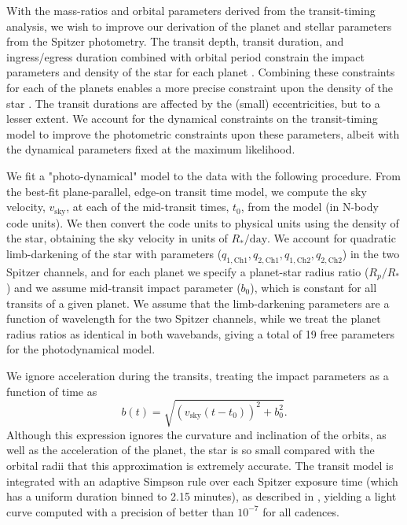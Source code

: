 \documentclass[fleqn,usenatbib]{mnras} %
\begin{document}
With the mass-ratios and orbital parameters derived from the transit-timing
analysis, we wish to improve our derivation of the planet and stellar parameters 
from the Spitzer photometry.   The transit depth, transit duration, and ingress/egress 
duration combined with  orbital period constrain the impact parameters and density 
of the star for each planet \citep{Seager2003}.  Combining these constraints for 
each of the planets  enables a more precise constraint upon the density of the 
star \citep{Kipping2012a}.
The transit durations are affected by the (small) eccentricities, but to a lesser extent.  We account 
for the dynamical constraints on the transit-timing model to improve the
photometric constraints upon these parameters, albeit with the dynamical parameters fixed 
at the maximum likelihood.

We fit a "photo-dynamical" model \citep{Carter2012} to the data with the following procedure.
From the best-fit plane-parallel, edge-on transit time model,
we compute the sky velocity, $v_\mathrm{sky}$, at each of the mid-transit times, $t_0$,
from the model (in N-body code units).  We then convert the code units to physical 
units using the density of the star, obtaining the sky velocity in units
of $R_*/\mathrm{day}$.
We account for quadratic limb-darkening of the star with parameters ($q_\mathrm{1,Ch1}, q_\mathrm{2,Ch1},q_\mathrm{1,Ch2},q_\mathrm{2,Ch2}$) in the two Spitzer channels, and for each
planet we specify a planet-star radius ratio ($R_p/R_*$) and we assume
mid-transit impact parameter ($b_0$), which is constant for all transits of
a given planet.  We assume that the limb-darkening parameters are a function
of wavelength for the two Spitzer channels, while we treat the planet radius
ratios as identical in both wavebands, giving a total of 19 free parameters
for the photodynamical model.

We ignore acceleration during the transits, treating the impact parameters as 
a function of time as
\begin{equation}
    b(t) = \sqrt{(v_\mathrm{sky} (t-t_0))^2 + b_0^2}.
\end{equation}
Although this expression ignores the curvature and inclination of the orbits, as well
as the acceleration of the planet, the star is so small compared with the orbital 
radii that this approximation is extremely accurate.  The transit model is integrated 
with an adaptive Simpson rule over each Spitzer exposure time (which has a uniform
duration binned to 2.15 minutes), as described in \citet{Agol2019}, yielding
a light curve computed with a precision of better than $10^{-7}$ for all cadences.
\end{document}
